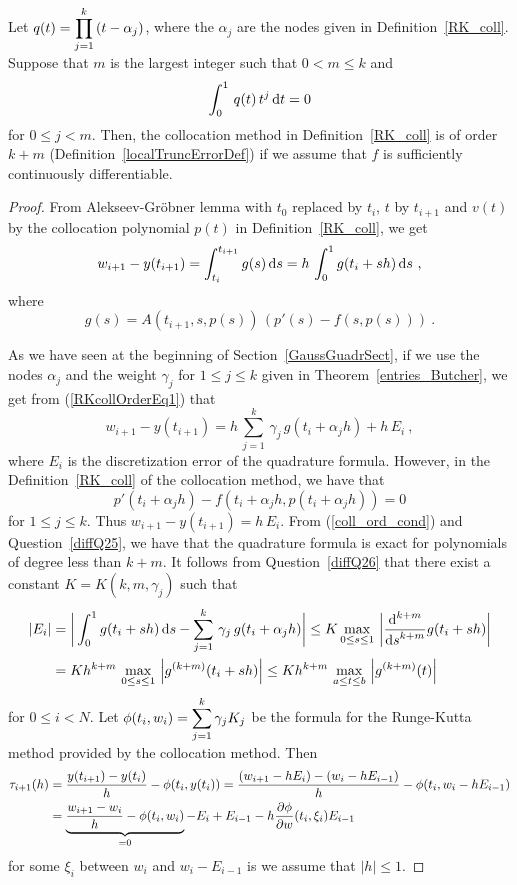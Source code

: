 \begin{theorem}
Let $\DS q(t) = \prod_{j=1}^k\,(t-\alpha_j)$, where the
$\alpha_j$ are the nodes given in Definition~\ref{RK_coll}.  Suppose
that $m$ is the largest integer such that $0 < m \leq k$ and
\begin{equation} \label{coll_ord_cond} 
\int_0^1 \, q(t)\,t^j\dx{t}  = 0
\end{equation}
for $0 \leq j < m$.  Then, the collocation method
in Definition~\ref{RK_coll} is of order $k+m$
(Definition~\ref{localTruncErrorDef}) if we assume that $f$ is
sufficiently continuously differentiable.
\label{RKcollOrder}
\end{theorem}

\begin{proof}
From Alekseev-Gr\"{o}bner lemma with $t_0$ replaced by $t_i$, $t$ by
$t_{i+1}$ and $v(t)$ by the collocation polynomial $p(t)$ in
Definition~\ref{RK_coll}, we get
\begin{equation}\label{RKcollOrderEq1}
w_{i+1} - y(t_{i+1}) = \int_{t_i}^{t_{i+1}} g(s) \dx{s}
= h\,\int_0^1 g(t_i+s h) \dx{s} \ ,
\end{equation}
where
\[
 g(s) = A(t_{i+1},s,p(s))\,\left( p'(s) - f(s,p(s)) \right) \ .
\]

As we have seen at the beginning of Section~\ref{GaussGuadrSect}, if
we use the nodes $\alpha_j$ and the weight $\gamma_j$ for $1\leq j \leq k$
given in Theorem~\ref{entries_Butcher}, we get from
(\ref{RKcollOrderEq1}) that
\[
w_{i+1} - y(t_{i+1}) = h\, \sum_{j=1}^k\,\gamma_j\, g(t_i+\alpha_j h) +
h\,E_i \ ,
\]
where $E_i$ is the discretization error of the quadrature formula.
However, in the Definition~\ref{RK_coll} of the collocation method, we
have that
\[
p'(t_i+\alpha_j h) - f(t_i+\alpha_j h,p(t_i+\alpha_j h)) =0
\]
for $1 \leq j \leq k$.  Thus $w_{i+1} - y(t_{i+1}) = h\,E_i$.
From (\ref{coll_ord_cond}) and Question~\ref{diffQ25}, we have
that the quadrature formula is exact for polynomials of degree less
than $k+m$.  It follows from Question~\ref{diffQ26}
that there exist a constant $K = K(k,m,\gamma_j)$ such that
\begin{align*}
|E_i| &= \bigg| \int_0^1 g(t_i+s h) \dx{s} -
\sum_{j=1}^k\,\gamma_j\, g(t_i+\alpha_j h) \bigg|
\leq K \max_{0\leq s \leq 1}\, \left| \dfdxn{g(t_i + s h)}{s}{k+m}\right| \\
& = K h^{k+m}\,\max_{0\leq s \leq 1}\, \left| g^{(k+m)}(t_i + s h) \right| 
\leq K h^{k+m}\,\max_{a\leq t \leq b}\, \left| g^{(k+m)}(t) \right|
\end{align*}
for $0\leq i <N$.  Let
$\DS \phi(t_i,w_i) = \sum_{j=1}^k\gamma_j K_j$ be the
formula for the Runge-Kutta method provided by the collocation method.
Then
\begin{align*}
\tau_{i+1}(h) &= \frac{y(t_{i+1}) - y(t_i)}{h} - \phi(t_i,y(t_i))
= \frac{(w_{i+1} - h E_i) - (w_i - h E_{i-1})}{h} -
\phi(t_i,w_i - h E_{i-1}) \\
&= \underbrace{\frac{w_{i+1} - w_i}{h} - \phi(t_i,w_i)}_{=0}
- E_i + E_{i-1} - h \pdydx{\phi}{w}(t_i,\xi_i)E_{i-1}
\end{align*}
for some $\xi_i$ between $w_i$ and $w_i - E_{i-1}$ is we assume that
$|h|\leq 1$.


\end{proof}
